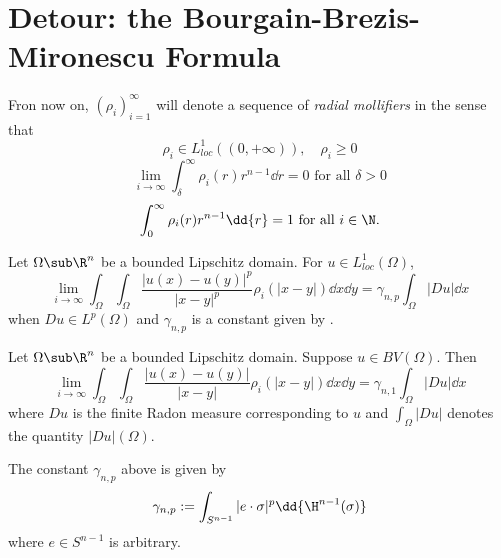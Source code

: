 \documentclass[../main.tex]{subfiles}
\begin{document}
\section{Detour: the Bourgain-Brezis-Mironescu Formula}

\begin{definition}
Fron now on, $ (\rho_{i})_{i=1}^{\infty} $ will denote a sequence of \textit{radial mollifiers} in the sense that 
\begin{equation}
    \rho_{i}\in L^{1}_{loc}((0,+\infty)),\quad \rho_{i}\geq 0
\end{equation}
\begin{equation}
    \lim_{i\to\infty}\int_{\delta}^{\infty} \rho_{i}(r)r^{n-1}\dd{r} = 0 \text{ for all } \delta>0 
\end{equation}
\begin{equation}
    \int_{0}^{\infty}\rho_{i}(r)r^{n-1}\dd{r} = 1 \text{ for all } i\in \N.
\end{equation}


\end{definition}

\begin{theorem}
    Let $ \Omega\sub \R^{n} $ be a bounded Lipschitz domain. For $ u\in L^{1}_{loc}(\Omega) $,
    \[
        \lim_{i\to\infty} \int_{\Omega}\int_{\Omega} \frac{|u(x)-u(y)|^{p}}{|x-y|^{p}} \rho_{i}(|x-y|)\dd{x} \dd{y} = \gamma_{n,p}\int_{\Omega}| Du| \dd{x}
    \]
    when $ Du\in L^{p}(\Omega) $ and $ \gamma_{n,p} $ is a constant given by . 
\end{theorem}

\begin{theorem}\label{bbmd}
    Let $ \Omega\sub \R^{n} $ be a bounded Lipschitz domain. Suppose $ u\in BV(\Omega) $. Then
    \[
        \lim_{i\to\infty} \int_{\Omega}\int_{\Omega} \frac{|u(x)-u(y)|}{|x-y|} \rho_{i}(|x-y|)\dd{x} \dd{y} = \gamma_{n,1}\int_{\Omega}| Du| \dd{x}
    \]
    where $ Du $ is the finite Radon measure corresponding to $ u $ and $ \int_{\Omega} |Du| $ denotes the quantity $ |Du |(\Omega) $.
\end{theorem}

The constant $ \gamma_{n,p} $ above is given by 
\[
    \gamma_{n,p}:= \int_{S^{n-1}} |e\cdot \sigma|^p \dd{\H^{n-1}(\sigma)}
\]
where $ e\in S^{n-1} $ is arbitrary.\\
\end{document}
